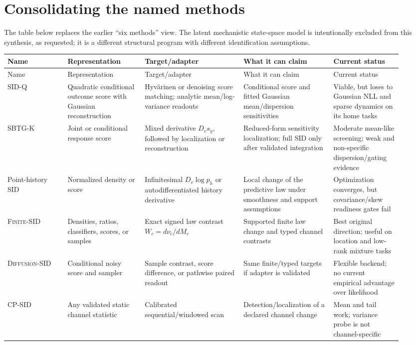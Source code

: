 \documentclass[10pt]{article}
\newcommand{\SIDQ}{\textnormal{\textsc{SID-Q}}\xspace}
\newcommand{\FiniteSID}{\textnormal{\textsc{Finite-SID}}\xspace}
\newcommand{\DiffSID}{\textnormal{\textsc{Diffusion-SID}}\xspace}
\newcommand{\SBTGK}{\textnormal{\textsc{SBTG-K}}\xspace}
\newcommand{\CPSID}{\textnormal{\textsc{CP-SID}}\xspace}
\begin{document}
\section{Consolidating the named methods}

The table below replaces the earlier ``six methods'' view. The latent mechanistic state-space model is intentionally excluded from this synthesis, as requested; it is a different structural program with different identification assumptions.

\begingroup
\setlength{\tabcolsep}{3pt}
\begin{longtable}{@{}p{0.14\linewidth}p{0.18\linewidth}p{0.23\linewidth}p{0.21\linewidth}p{0.16\linewidth}@{}}
\toprule
Name & Representation & Target/adapter & What it can claim & Current status \\
\midrule
\endfirsthead
\toprule
Name & Representation & Target/adapter & What it can claim & Current status \\
\midrule
\endhead
\SIDQ & Quadratic conditional outcome score with Gaussian reconstruction & Hyv\"arinen or denoising score matching; analytic mean/log-variance readouts & Conditional score and fitted Gaussian mean/dispersion sensitivities & Viable, but loses to Gaussian NLL and sparse dynamics on its home tasks \\
\SBTGK & Joint or conditional response score & Mixed derivative \(D_v s_y\), followed by localization or reconstruction & Reduced-form sensitivity localization; full SID only after validated integration & Moderate mean-like screening; weak and non-specific dispersion/gating evidence \\
Point-history SID & Normalized density or score & Infinitesimal \(D_v\log p_h\) or autodifferentiated history derivative & Local change of the predictive law under smoothness and support assumptions & Optimization converges, but covariance/skew readiness gates fail \\
\FiniteSID & Densities, ratios, classifiers, scores, or samples & Exact signed law contrast \(W_c=d\nu_c/dM_c\) & Supported finite law change and typed channel contrasts & Best original direction; useful on location and low-rank mixture tasks \\
\DiffSID & Conditional noisy score and sampler & Sample contrast, score difference, or pathwise paired readout & Same finite/typed targets if adapter is validated & Flexible backend; no current empirical advantage over likelihood \\
\CPSID & Any validated static channel statistic & Calibrated sequential/windowed scan & Detection/localization of a declared channel change & Mean and tail work; variance probe is not channel-specific \\
\bottomrule
\end{longtable}
\endgroup
\end{document}
